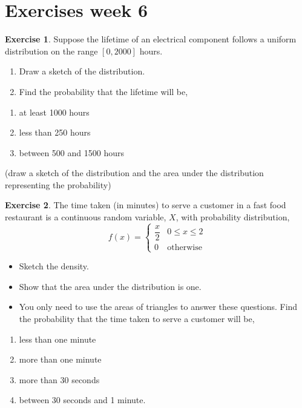 \documentclass[
]{book}
\providecommand{\tightlist}{%
  \setlength{\itemsep}{0pt}\setlength{\parskip}{0pt}}
\theoremstyle{definition}
\theoremstyle{definition}
\theoremstyle{definition}
\newtheorem{exercise}{Exercise}[chapter]
\theoremstyle{definition}
\theoremstyle{remark}
\begin{document}
\hypertarget{exercises-week-6}{%
\section{Exercises week 6}\label{exercises-week-6}}

\begin{exercise}
Suppose the lifetime of an electrical component follows
a uniform distribution on the range \([0,2000]\) hours.

\begin{enumerate}
\def\labelenumi{\alph{enumi})}
\item
  Draw a sketch of the distribution.
\item
  Find the probability that the lifetime will be,
\end{enumerate}

\begin{enumerate}
\def\labelenumi{(\roman{enumi})}
\tightlist
\item
  at least 1000 hours
\item
  less than 250 hours
\item
  between 500 and 1500 hours
\end{enumerate}

(draw a sketch of the distribution and the area under the
distribution representing the probability)
\end{exercise}

\begin{exercise}

The time taken (in minutes) to serve a customer in a fast food
restaurant is a continuous random variable, \(X\), with probability
distribution,
\[ f(x) = \left \{\begin{array}{ll}
  \dfrac{x}{2}& 0\leq x \leq 2 \\
  0 & \mbox{otherwise}
\end{array} \right .
\]

\begin{itemize}
\tightlist
\item
  Sketch the density.
\item
  Show that the area under the distribution is one.
\item
  You only need to use the areas of triangles to answer these
  questions. Find the probability that the time taken to serve a
  customer will be,
\end{itemize}

\begin{enumerate}
\def\labelenumi{\roman{enumi}.}
\tightlist
\item
  less than one minute
\item
  more than one minute
\item
  more than 30 seconds
\item
  between 30 seconds and 1 minute.
\end{enumerate}

\end{exercise}
\end{document}
